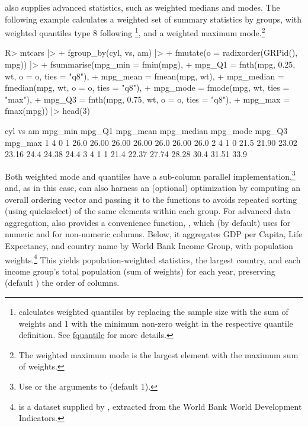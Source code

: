 \documentclass[article]{jss}
\newcommand{\fct}[1]{\code{#1()}}
\begin{document}
 also supplies advanced statistics, such as weighted medians and modes. The following example calculates a weighted set of summary statistics by groups, with weighted quantiles type 8 following \citet{hyndman1996sample}\footnote{ calculates weighted quantiles by replacing the sample size with the sum of weights and 1 with the minimum non-zero weight in the respective quantile definition. See \href{https://sebkrantz.github.io/collapse/reference/fquantile.html}{fquantile} for more details.}, and a weighted maximum mode.\footnote{The weighted maximum mode is the largest element with the maximum sum of weights.}
%
\begin{Schunk}
\begin{Sinput}
R> mtcars |>
+      fgroup_by(cyl, vs, am) |>
+      fmutate(o = radixorder(GRPid(), mpg)) |>
+      fsummarise(mpg_min = fmin(mpg),
+                 mpg_Q1 = fnth(mpg, 0.25, wt, o = o, ties = "q8"),
+                 mpg_mean = fmean(mpg, wt),
+                 mpg_median = fmedian(mpg, wt, o = o, ties = "q8"),
+                 mpg_mode = fmode(mpg, wt, ties = "max"),
+                 mpg_Q3 = fnth(mpg, 0.75, wt, o = o, ties = "q8"),
+                 mpg_max = fmax(mpg)) |> head(3)
\end{Sinput}
\begin{Soutput}
  cyl vs am mpg_min mpg_Q1 mpg_mean mpg_median mpg_mode mpg_Q3 mpg_max
1   4  0  1    26.0  26.00    26.00      26.00     26.0  26.00    26.0
2   4  1  0    21.5  21.90    23.02      23.16     24.4  24.38    24.4
3   4  1  1    21.4  22.37    27.74      28.28     30.4  31.51    33.9
\end{Soutput}
\end{Schunk}
%
Both weighted mode and quantiles have a sub-column parallel implementation,\footnote{Use  or the  arguments to  (default 1).} and, as in this case, can also harness an (optional) optimization by computing an overall ordering vector and passing it to the functions to avoids repeated sorting (using quickselect) of the same elements within each group. For advanced data aggregation,  also provides a convenience function, \fct{collap}, which (by default) uses  for numeric and  for non-numeric columns. Below, it aggregates GDP per Capita, Life Expectancy, and country name by World Bank Income Group, with population weights.\footnote{\href{https://sebkrantz.github.io/collapse/reference/wlddev.html}{} is a dataset supplied by , extracted from the World Bank World Development Indicators.} This yields population-weighted statistics, the largest country, and each income group's total population (sum of weights) for each year, preserving (default ) the order of columns.
\end{document}

